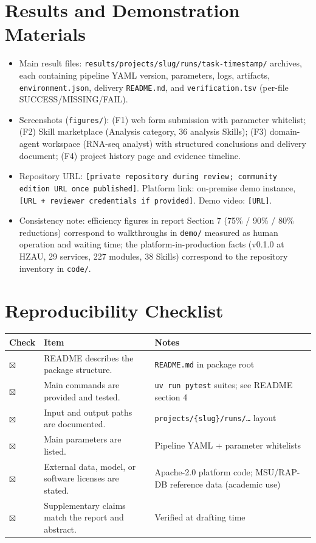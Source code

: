 \documentclass[11pt,a4paper]{article}
\begin{document}
\section{Results and Demonstration Materials}
\begin{itemize}
  \item Main result files: \texttt{results/projects/\textlangle slug\textrangle /runs/\textlangle task\textrangle -\textlangle timestamp\textrangle /} archives, each containing pipeline YAML version, parameters, logs, artifacts, \texttt{environment.json}, delivery \texttt{README.md}, and \texttt{verification.tsv} (per-file SUCCESS/MISSING/FAIL).
  \item Screenshots (\texttt{figures/}): (F1) web form submission with parameter whitelist; (F2) Skill marketplace (Analysis category, 36 analysis Skills); (F3) domain-agent workspace (RNA-seq analyst) with structured conclusions and delivery document; (F4) project history page and evidence timeline.
  \item Repository URL: \texttt{[private repository during review; community edition URL once published]}. Platform link: on-premise demo instance, \texttt{[URL + reviewer credentials if provided]}. Demo video: \texttt{[URL]}.
  \item Consistency note: efficiency figures in report Section 7 (75\% / 90\% / 80\% reductions) correspond to walkthroughs in \texttt{demo/} measured as human operation and waiting time; the platform-in-production facts (v0.1.0 at HZAU, 29 services, 227 modules, 38 Skills) correspond to the repository inventory in \texttt{code/}.
\end{itemize}

\section{Reproducibility Checklist}
\begin{tabularx}{\textwidth}{p{}X X}
\toprule
\textbf{Check} & \textbf{Item} & \textbf{Notes}\\
\midrule
$\boxtimes$ & README describes the package structure. & \texttt{README.md} in package root\\
$\boxtimes$ & Main commands are provided and tested. & \texttt{uv run pytest} suites; see README section 4\\
$\boxtimes$ & Input and output paths are documented. & \texttt{projects/\{slug\}/runs/\dots} layout\\
$\boxtimes$ & Main parameters are listed. & Pipeline YAML + parameter whitelists\\
$\boxtimes$ & External data, model, or software licenses are stated. & Apache-2.0 platform code; MSU/RAP-DB reference data (academic use)\\
$\boxtimes$ & Supplementary claims match the report and abstract. & Verified at drafting time\\
\bottomrule
\end{tabularx}
\end{document}
